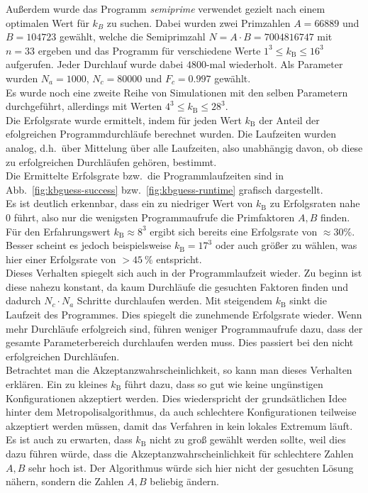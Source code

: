 Außerdem wurde das Programm \textit{semiprime} verwendet gezielt nach einem optimalen Wert für $k_B$ zu suchen. Dabei wurden zwei Primzahlen $A=66889$ und $B=104723$ gewählt, welche die Semiprimzahl $N=A\cdot B=7004816747$ mit $n=33$ ergeben und das Programm für verschiedene Werte $1^3\leq k_\mathrm{B}\leq 16^3$ aufgerufen. Jeder Durchlauf wurde dabei $4800$-mal wiederholt. Als Parameter wurden $N_a=1000$, $N_c=80000$ und $F_c=0.997$ gewählt. \\
Es wurde noch eine zweite Reihe von Simulationen mit den selben Parametern durchgeführt, allerdings mit Werten $4^3\leq k_\mathrm{B} \leq 28^3$. \\
Die Erfolgsrate wurde ermittelt, indem für jeden Wert $k_\mathrm{B}$ der Anteil der efolgreichen Programmdurchläufe berechnet wurden. Die Laufzeiten wurden analog, d.h.\ über Mittelung über alle Laufzeiten, also unabhängig davon, ob diese zu erfolgreichen Durchläufen gehören, bestimmt.\\
Die Ermittelte Erfolsgrate bzw.\ die Programmlaufzeiten sind in Abb.~\ref{fig:kbguess-success} bzw.~\ref{fig:kbguess-runtime} grafisch dargestellt. \\
Es ist deutlich erkennbar, dass ein zu niedriger Wert von $k_\mathrm{B}$ zu Erfolgsraten nahe $0$ führt, also nur die wenigsten Programmaufrufe die Primfaktoren $A,B$ finden. Für den Erfahrungswert $k_\mathrm{B}\approx 8^3$ ergibt sich bereits eine Erfolgsrate von $\approx30\%$. Besser scheint es jedoch beispielsweise $k_\mathrm{B}=17^3$ oder auch größer zu wählen, was hier einer Erfolgsrate von $>\SI{45}{\percent}$ entspricht. \\
Dieses Verhalten spiegelt sich auch in der Programmlaufzeit wieder. Zu beginn ist diese nahezu konstant, da kaum Durchläufe die gesuchten Faktoren finden und dadurch $N_c\cdot N_a$ Schritte durchlaufen werden. Mit steigendem $k_\mathrm{B}$ sinkt die Laufzeit des Programmes. Dies spiegelt die zunehmende Erfolgsrate wieder. Wenn mehr Durchläufe erfolgreich sind, führen weniger Programmaufrufe dazu, dass der gesamte Parameterbereich durchlaufen werden muss. Dies passiert bei den nicht erfolgreichen Durchläufen. \\
Betrachtet man die Akzeptanzwahrscheinlichkeit, so kann man dieses Verhalten erklären. Ein zu kleines $k_\mathrm{B}$ führt dazu, dass so gut wie keine ungünstigen Konfigurationen akzeptiert werden. Dies wiederspricht der grundsätlichen Idee hinter dem Metropolisalgorithmus, da auch schlechtere Konfigurationen teilweise akzeptiert werden müssen, damit das Verfahren in kein lokales Extremum läuft. Es ist auch zu erwarten, dass $k_\mathrm{B}$ nicht zu groß gewählt werden sollte, weil dies dazu führen würde, dass die Akzeptanzwahrscheinlichkeit für schlechtere Zahlen $A, B$ sehr hoch ist. Der Algorithmus würde sich hier nicht der gesuchten Lösung nähern, sondern die Zahlen $A, B$ beliebig ändern. \\
